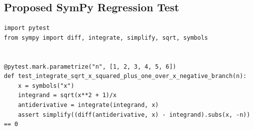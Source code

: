 \documentclass[11pt]{article}
\begin{document}
\subsection{Proposed SymPy Regression Test}

\medskip

\begin{lstlisting}[style=bugpython]
import pytest
from sympy import diff, integrate, simplify, sqrt, symbols


@pytest.mark.parametrize("n", [1, 2, 3, 4, 5, 6])
def test_integrate_sqrt_x_squared_plus_one_over_x_negative_branch(n):
    x = symbols("x")
    integrand = sqrt(x**2 + 1)/x
    antiderivative = integrate(integrand, x)
    assert simplify((diff(antiderivative, x) - integrand).subs(x, -n)) == 0
\end{lstlisting}
\end{document}
